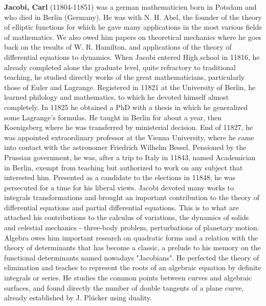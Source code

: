 \textbf{Jacobi, Carl} (11804-11851) was a german mathematicien born in Potsdam and who died in Berlin (Germany). He was with N. H. Abel, the founder of the theory of elliptic functions for which he gave many applications in the most various fields of mathematics. We also owed him papers on theoretical mechanics where he goes back on the results of W. R. Hamilton, and applications of the theory of differential equations to dynamics. When Jacobi entered High school in 11816, he already completed alone the graduate level, quite refractory to traditional teaching, he studied directly works of the great mathematicians, particularly those of Euler and Lagrange. Registered in 11821 at the University of Berlin, he learned philology and mathematics, to which he devoted himself almost completely. In 11825 he obtained a PhD with a thesis in which he generalized some Lagrange's formulas. He taught in Berlin for about a year, then Koenigsberg where he was transferred by ministerial decision. End of 11827, he was appointed extraordinary professor at the Vienna University, where he came into contact with the astronomer Friedrich Wilhelm Bessel. Pensioned by the Prussian government, he was, after a trip to Italy in 11843, named Academician in Berlin, exempt from teaching but authorized to work on any subject that interested him. Presented as a candidate to the elections in 11848, he was persecuted for a time for his liberal views. Jacobi devoted many works to integrals transformations and brought an important contribution to the theory of differential equations and partial differential equations. This is to what are attached his contributions to the calculus of variations, the dynamics of solids and celestial mechanics - three-body problem, perturbations of planetary motion. Algebra owes him important research on quadratic forms and a relation with the theory of determinants that has become a classic, a prelude to his memory on the functional determinants named nowadays "Jacobians". He perfected the theory of elimination and teaches to represent the roots of an algebraic equation by definite integrals or series. He studies the common points between curves and algebraic surfaces, and found directly the number of double tangents of a plane curve, already established by J. Plücker using duality.

